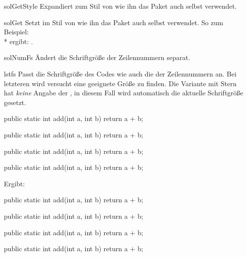 \documentclass{sopra-base}
\begin{document}
\begin{command}{solGetStyle}{}
    Expandiert zum Stil von  wie ihn das Paket auch selbst verwendet.
\end{command}

\begin{command}{solGet}{}
    Setzt  im Stil von  wie ihn das Paket auch selbst verwendet. So zum Beispiel:\\* ergibt: .
\end{command}

\begin{command}{solNumFs}{}
    Ändert die Schriftgröße der Zeilennummern separat.
\end{command}

\begin{command}{lstfs}{\optStar{}}
    Passt die Schriftgröße des Codes wie auch die der Zeilennummern an. Bei letzteren wird versucht eine geeignete Größe zu finden.
    Die Variante mit Stern hat \textit{keine} Angabe der , in diesem Fall wird automatisch die aktuelle Schriftgröße gesetzt.
\begin{latex}[morekeywords={[5]{\\lstfs}}]
\begin{java}
public static int add(int a, int b){ return a + b; }
\end{java}
{
\begin{java}
public static int add(int a, int b){ return a + b; }
\end{java}
}
\begin{java}
public static int add(int a, int b){ return a + b; }
\end{java}
{\tiny
\begin{java}
public static int add(int a, int b){ return a + b; }
\end{java}
}
\end{latex}
Ergibt:
\begin{java}
public static int add(int a, int b){ return a + b; }
\end{java}
{
\begin{java}
public static int add(int a, int b){ return a + b; }
\end{java}
}
\begin{java}
public static int add(int a, int b){ return a + b; }
\end{java}
{\tiny
\begin{java}
public static int add(int a, int b){ return a + b; }
\end{java}
}
\end{command}
\end{document}
